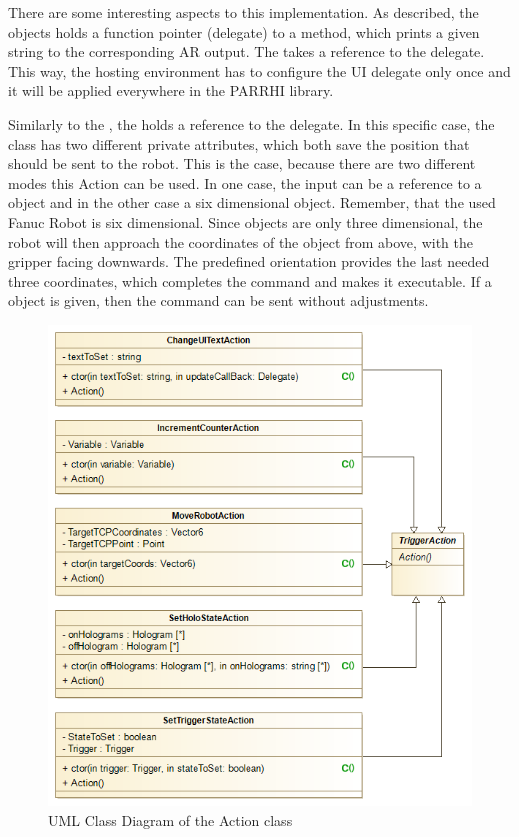 There are some interesting aspects to this implementation. As described, the  objects holds a function pointer (delegate) to a method, which prints a given string to the corresponding AR output. The  takes a reference to the  delegate. This way, the hosting environment has to configure the UI delegate only once and it will be applied everywhere in the PARRHI library.

Similarly to the , the  holds a reference to the  delegate. In this specific case, the class has two different private attributes, which both save the position that should be sent to the robot. This is the case, because there are two different modes this Action can be used. In one case, the input can be a reference to a  object and in the other case a six dimensional  object. Remember, that the used Fanuc Robot is six dimensional. Since  objects are only three dimensional, the robot will then approach the coordinates of the  object from above, with the gripper facing downwards. The predefined orientation provides the last needed three coordinates, which completes the command and makes it executable. If a  object is given, then the command can be sent without adjustments.

\begin{figure}[!th]
	\centering
	\includegraphics[width=0.7\linewidth]{Figures/Implementation_Action}
	\caption{UML Class Diagram of the Action class}
	\label{Fig:ImplementationAction}
\end{figure}

